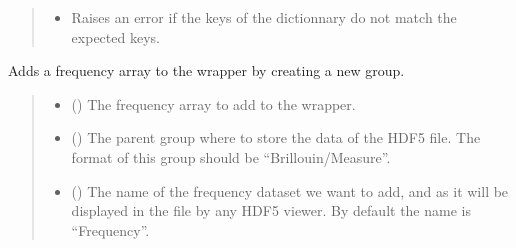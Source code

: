 \documentclass[letterpaper,10pt,english]{sphinxmanual}
\begin{document}
\begin{fulllineitems}
\begin{fulllineitems}
\begin{quote}
\begin{description}
\begin{itemize}
\item {} 
\sphinxAtStartPar
{} \textendash{} Raises an error if the keys of the dictionnary do not match the expected keys.

\end{itemize}

\end{description}\end{quote}

\end{fulllineitems}


\begin{fulllineitems}
\label{\detokenize{_autosummary/HDF5_BLS.wrapper:HDF5_BLS.wrapper.Wrapper.add_frequency}}
\pysigstartsignatures
\pysiglinewithargsret
{}
{\sphinxparamcomma {}\sphinxparamcomma {}\sphinxparamcomma {}}
{}
\pysigstopsignatures
\sphinxAtStartPar
Adds a frequency array to the wrapper by creating a new group.
\begin{quote}\begin{description}
\begin{itemize}
\item {} 
\sphinxAtStartPar
{} () \textendash{} The frequency array to add to the wrapper.

\item {} 
\sphinxAtStartPar
{} (\sphinxstyleliteralemphasis{\sphinxupquote{, }}) \textendash{} The parent group where to store the data of the HDF5 file. The format of this group should be “Brillouin/Measure”.

\item {} 
\sphinxAtStartPar
{} (\sphinxstyleliteralemphasis{\sphinxupquote{, }}) \textendash{} The name of the frequency dataset we want to add, and as it will be displayed in the file by any HDF5 viewer. By default the name is “Frequency”.


\end{itemize}
\end{description}
\end{quote}
\end{fulllineitems}
\end{fulllineitems}
\end{document}
